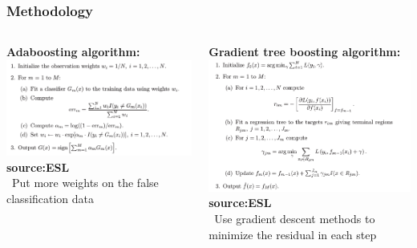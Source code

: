\documentclass[xcolor={x11names,svgnames,dvipsnames}]{beamer}
\begin{document}
\begin{frame}
	\frametitle{Methodology}
\begin{columns}

	\begin{column}{.5\textwidth}
		\textbf{Adaboosting algorithm:}\\
		\includegraphics[width=1\textwidth, height=0.5\textheight]{adaboosting.png}\\
		\small{\textbf{source:ESL}}\\
		\alert{\textbullet\ Put more weights on the false classification data}
	\end{column}
	\begin{column}{.5\textwidth}
		\textbf{Gradient tree boosting algorithm:}\\
		\includegraphics[width=1\textwidth, height=0.5\textheight]{gradientboost.png}\\
	    \small{\textbf{source:ESL}}\\
	    \alert{\textbullet\ Use gradient descent methods to minimize the residual in each step}
	\end{column}
\end{columns}	
\end{frame}
\end{document}
